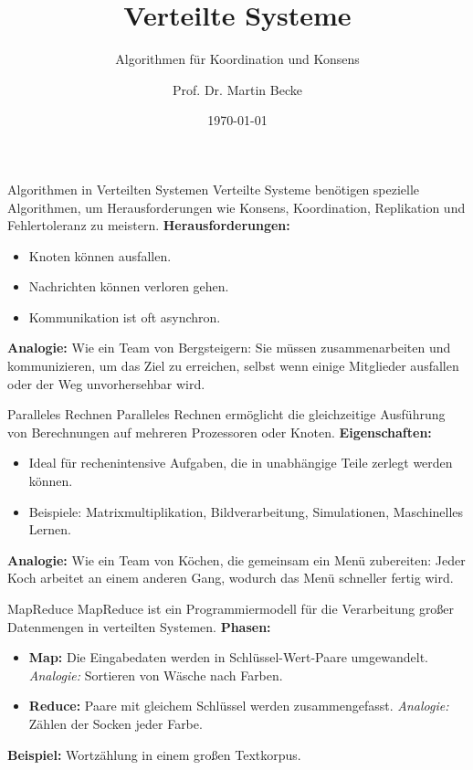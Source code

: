\documentclass{beamer}
\title{Verteilte Systeme}
\subtitle{Algorithmen für Koordination und Konsens}
\author{Prof. Dr. Martin Becke}
\date{\today}
\begin{document}
\begin{frame}
    \titlepage
\end{frame}

\begin{frame}{Algorithmen in Verteilten Systemen}
    Verteilte Systeme benötigen spezielle Algorithmen, um Herausforderungen wie Konsens, Koordination, Replikation und Fehlertoleranz zu meistern. \newline
    \textbf{Herausforderungen:}
    \begin{itemize}
        \item Knoten können ausfallen.
        \item Nachrichten können verloren gehen.
        \item Kommunikation ist oft asynchron.
    \end{itemize}
    \textbf{Analogie:} Wie ein Team von Bergsteigern: Sie müssen zusammenarbeiten und kommunizieren, um das Ziel zu erreichen, selbst wenn einige Mitglieder ausfallen oder der Weg unvorhersehbar wird.
\end{frame}

\begin{frame}{Paralleles Rechnen}
    Paralleles Rechnen ermöglicht die gleichzeitige Ausführung von Berechnungen auf mehreren Prozessoren oder Knoten. \newline
    \textbf{Eigenschaften:}
    \begin{itemize}
        \item Ideal für rechenintensive Aufgaben, die in unabhängige Teile zerlegt werden können.
        \item Beispiele: Matrixmultiplikation, Bildverarbeitung, Simulationen, Maschinelles Lernen.
    \end{itemize}
    \textbf{Analogie:} Wie ein Team von Köchen, die gemeinsam ein Menü zubereiten: Jeder Koch arbeitet an einem anderen Gang, wodurch das Menü schneller fertig wird.
\end{frame}

\begin{frame}{MapReduce}
    MapReduce ist ein Programmiermodell für die Verarbeitung großer Datenmengen in verteilten Systemen. \newline
    \textbf{Phasen:}
    \begin{itemize}
        \item \textbf{Map:} Die Eingabedaten werden in Schlüssel-Wert-Paare umgewandelt. \newline \textit{Analogie:} Sortieren von Wäsche nach Farben.
        \item \textbf{Reduce:} Paare mit gleichem Schlüssel werden zusammengefasst. \newline \textit{Analogie:} Zählen der Socken jeder Farbe.
    \end{itemize}
    \textbf{Beispiel:} Wortzählung in einem großen Textkorpus.
\end{frame}
\end{document}

